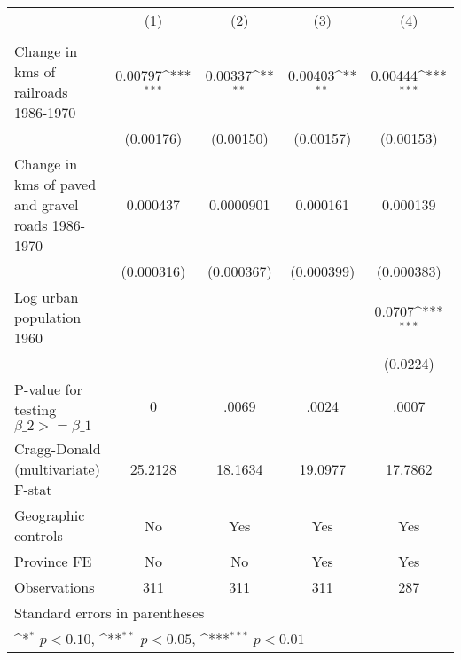{
\def\sym#1{\ifmmode^{#1}\else\(^{#1}\)\fi}
\begin{tabular}{l*{4}{c}}
\hline\hline
                &\multicolumn{1}{c}{(1)}&\multicolumn{1}{c}{(2)}&\multicolumn{1}{c}{(3)}&\multicolumn{1}{c}{(4)}\\
                &\multicolumn{1}{c}{}&\multicolumn{1}{c}{}&\multicolumn{1}{c}{}&\multicolumn{1}{c}{}\\
\hline
Change in kms of railroads 1986-1970&  0.00797\sym{***}&  0.00337\sym{**} &  0.00403\sym{**} &  0.00444\sym{***}\\
                &(0.00176)         &(0.00150)         &(0.00157)         &(0.00153)         \\
[1em]
Change in kms of paved and gravel roads 1986-1970& 0.000437         &0.0000901         & 0.000161         & 0.000139         \\
                &(0.000316)         &(0.000367)         &(0.000399)         &(0.000383)         \\
[1em]
Log urban population 1960&                  &                  &                  &   0.0707\sym{***}\\
                &                  &                  &                  & (0.0224)         \\
\hline
P-value for testing $\beta\_{2} >= \beta\_{1}$&        0         &    .0069         &    .0024         &    .0007         \\
Cragg-Donald (multivariate) F-stat&  25.2128         &  18.1634         &  19.0977         &  17.7862         \\
Geographic controls&       No         &      Yes         &      Yes         &      Yes         \\
Province FE     &       No         &       No         &      Yes         &      Yes         \\
Observations    &      311         &      311         &      311         &      287         \\
\hline\hline
\multicolumn{5}{l}{\footnotesize Standard errors in parentheses}\\
\multicolumn{5}{l}{\footnotesize \sym{*} \(p<0.10\), \sym{**} \(p<0.05\), \sym{***} \(p<0.01\)}\\
\end{tabular}
}
